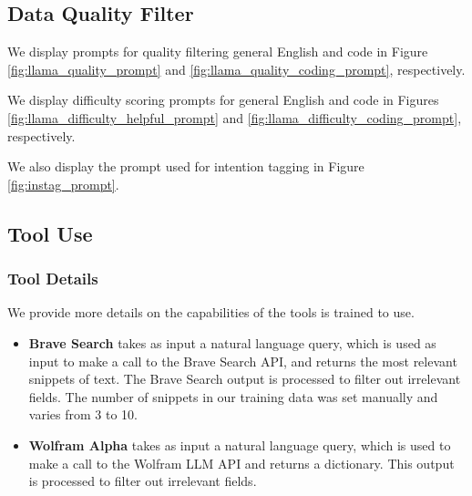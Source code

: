 

\subsection{Data Quality Filter}\label{knowledge_probe}

We display prompts for quality filtering general English and code in Figure \ref{fig:llama_quality_prompt} and \ref{fig:llama_quality_coding_prompt}, respectively.

We display difficulty scoring prompts for general English and code in Figures \ref{fig:llama_difficulty_helpful_prompt} and \ref{fig:llama_difficulty_coding_prompt}, respectively.

We also display the prompt used for intention tagging in Figure \ref{fig:instag_prompt}.












\subsection{Tool Use}\label{appendix:tools}

\subsubsection{Tool Details}\label{appendix:tools_implem}
We provide more details on the capabilities of the tools \llamathree is trained to use.
\begin{itemize}
    \item \textbf{Brave Search} takes as input a natural language query, which is used as input to make a call to the Brave Search API, and returns the most relevant snippets of text. The Brave Search output is processed to filter out irrelevant fields. The number of snippets in our training data was set manually and varies from 3 to 10.
    \item \textbf{Wolfram Alpha} takes as input a natural language query, which is used to make a call to the Wolfram LLM API and returns a dictionary. This output is processed to filter out irrelevant fields.
\end{itemize}

